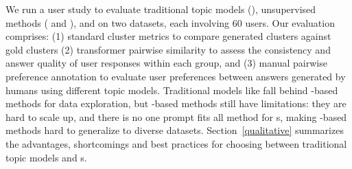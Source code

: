 We run a user study to evaluate traditional topic models (), unsupervised \mm{} methods (\topicgpt{} and \lloom{}), and \bass{} on two datasets, each involving 60 users.
%
%
Our evaluation comprises: (1) standard cluster metrics to compare
generated clusters against gold clusters (2) transformer pairwise
similarity to assess the consistency and answer quality of user
responses within each group, and (3) manual pairwise preference
annotation to evaluate user preferences between answers generated by
humans using different topic models.
%
%
Traditional models like  fall
behind \mm{}-based methods for data exploration,
but \mm{}-based methods still have limitations: they are hard
to scale up, and there is no one prompt fits all method
for \mm{}s, making \mm{}-based methods hard to
generalize to diverse datasets. 
%
Section~\ref{qualitative} summarizes the advantages, shortcomings and best practices for choosing between traditional topic models and \mm{}s.

%
%




